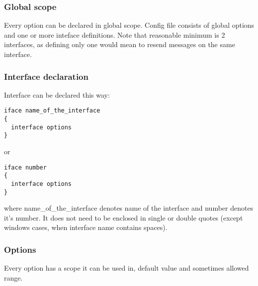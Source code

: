 \subsubsection{Global scope}

Every option can be declared in global scope.
Config file consists of global options and one or more inteface
definitions. Note that reasonable minimum is 2 interfaces, as defining
only one would mean to resend messages on the same interface.

\subsubsection{Interface declaration}

Interface can be declared this way:
\begin{verbatim}
iface name_of_the_interface
{
  interface options
}
\end{verbatim}

or 

\begin{verbatim}
iface number 
{
  interface options
}
\end{verbatim}

where name\_of\_the\_interface denotes name of the interface and
number denotes it's number. It does not need to be enclosed in
single or double quotes (except windows cases, when interface name
contains spaces).

\subsubsection{Options}

Every option has a scope it can be used in, default value and
sometimes allowed range.

